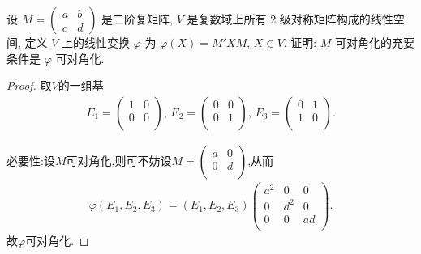 \documentclass[../../main.tex]{subfiles}%
\begin{document}
\begin{example}
设 $M = \begin{pmatrix} a & b \\ c & d \end{pmatrix}$ 是二阶复矩阵, $V$ 是复数域上所有 2 级对称矩阵构成的线性空间, 定义 $V$ 上的线性变换 $\varphi$ 为 $\varphi(X) = M'XM$, $X \in V$. 证明: $M$ 可对角化的充要条件是 $\varphi$ 可对角化.
\end{example}
\begin{proof}
取$V$的一组基
\begin{align*}
E_1=\begin{pmatrix}
1&		0\\
0&		0\\
\end{pmatrix},\,E_2=\begin{pmatrix}
0&		0\\
0&		1\\
\end{pmatrix},\,E_3=\begin{pmatrix}
0&		1\\
1&		0\\
\end{pmatrix}.
\end{align*}

{\heiti 必要性:}设$M$可对角化,则可不妨设$M=\begin{pmatrix}
a&		0\\
0&		d\\
\end{pmatrix}$,从而
\begin{align*}
\varphi(E_1,E_2,E_3)=(E_1,E_2,E_3)\begin{pmatrix}
a^2&		0&		0\\
0&		d^2&		0\\
0&		0&		ad\\
\end{pmatrix}.
\end{align*}
故$\varphi$可对角化.


\end{proof}
\end{document}

